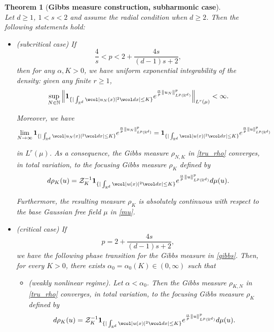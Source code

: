 \documentclass[%
11pt,  reqno]{amsart}
\newtheorem{theorem}{Theorem} [section]
\theoremstyle{remarkstyle}
\newcommand{\1}{\hspace{0.2mm}\text{I}\hspace{0.2mm}}
\newcommand{\noi}{\noindent}
\newcommand{\R}{\mathbb{R}}
\newcommand{\al}{\alpha}
\newcommand{\wick}[1]{\wcol#1\wcol}
\newcommand{\ind}{\mathbf 1}
\numberwithin{equation}{section}
\numberwithin{theorem}{section}
\begin{document}
	
	\begin{theorem}[\textbf{Gibbs measure construction, subharmonic case}]\label{THM:main}\mbox{}\\
		Let $d\ge 1$, $1<s<2$ and assume the radial condition when $d\ge 2$. Then the following statements hold\textup{:}
		
		\smallskip
		
		\noi
		\begin{itemize}
			\item
			[\textup{(i)}] \textup{(subcritical case)} 
			If 
			$$\frac4s < p< 2+\frac{4s}{(d-1)s+2},$$
			then for any $\al, K > 0$, we have uniform exponential integrability of the density:
			given any finite $r \ge 1$, 
			\begin{align}
				\label{uniint_p}
				\sup_{N \in \mathbb N} \Big\|  \ind_{ \{ | \int_{\R^d} \wick{ | u_N (x)|^2 } dx | \le K\}}  e^{\frac{\al} p{\| u_N \|_{L^p (\R^d)}^p}} \Big\|_{L^r (\mu)}   < \infty .
			\end{align}
			
			\noi
			Moreover, we have
			\begin{align}
				\lim_{N \to \infty}  \ind_{ \{ | \int_{\R^d} \wick{ | u_N (x)|^2 } dx | \le K\}}  e^{\frac{\al} p{\| u_N \|_{L^p (\R^d)}^p}} 
				=  \ind_{ \{ | \int_{\R^d} \wick{ | u (x)|^2 } dx | \le K\}}  e^{\frac{\al} p{\| u \|_{L^p (\R^d)}^p}} 
				\label{cov-lp}
			\end{align}
			
			\noi
			in $ L^r(\mu)$.
			As a consequence, the Gibbs measure $\rho_{N,K}$ in \eqref{tru_rho} converges, in total variation,
			to the focusing Gibbs measure $\rho_K$ defined by
			\begin{align}
				\label{rho}
				d \rho_K (u) = \mathcal  Z_{K}^{-1} \ind_{ \{ | \int_{\R^d} \wick{ | u (x)|^2 } dx | \le K\}}  e^{\frac{\al} p{\| u \|_{L^p (\R^d)}^p}} d\mu (u)  .
			\end{align}
			
			\noi
			Furthermore, the resulting measure $\rho_K$ is absolutely continuous with respect to the base Gaussian free field $\mu$ in \eqref{mu}.
			
			\smallskip
			
			\noi
			\item[\textup{(ii)}] \textup{(critical case)}
			If 
			$$p = 2+\frac{4s}{(d-1)s +2},$$
			we have the following phase transition for the Gibbs measure in \eqref{gibbs}. Then, for every $K > 0$, there exists $\al_0 = \al_0(K) \in (0, \infty)$ such that
			\begin{itemize}
				\item[\textup{(a)}]  \textup{(weakly nonlinear regime)}.
				Let $ \al < \al_0$.
				Then the Gibbs measure $\rho_{K,N}$ in \eqref{tru_rho} converges, in total variation, to the focusing Gibbs measure $\rho_K$ defined by
				\begin{align}
					\label{rho1}
					d \rho_K (u) = \mathcal  Z_{K}^{-1} \ind_{ \{ | \int_{\R^d} \wick{ | u (x)|^2 } dx | \le K\}}  e^{\frac{\al} p{\| u \|_{L^p (\R^d)}^p}} d\mu (u)  .
				\end{align}
				

\end{itemize}
\end{itemize}
\end{theorem}
\end{document}
